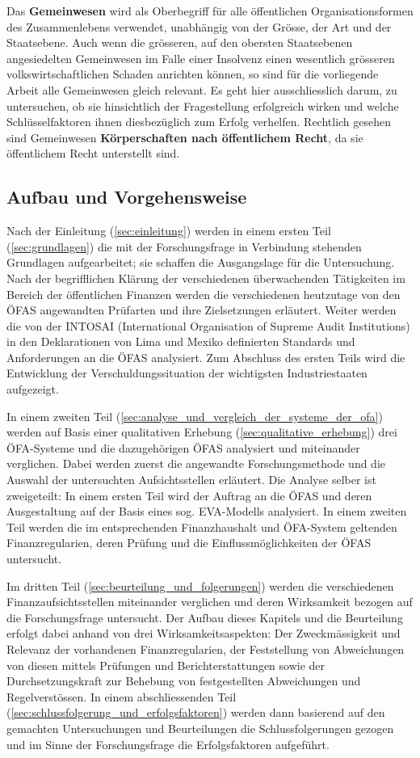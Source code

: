 \documentclass[10pt]{article}
\begin{document}
Das \textbf{Gemeinwesen} wird als Oberbegriff für alle öffentlichen Organisationsformen des Zusammenlebens verwendet, unabhängig von der Grösse, der Art und der Staatsebene. Auch wenn die grösseren, auf den obersten Staatsebenen angesiedelten Gemeinwesen im Falle einer Insolvenz einen wesentlich grösseren volkswirtschaftlichen Schaden anrichten können, so sind für die vorliegende Arbeit alle Gemeinwesen gleich relevant. Es geht hier ausschliesslich darum, zu untersuchen, ob sie hinsichtlich der Fragestellung erfolgreich wirken und welche Schlüsselfaktoren ihnen diesbezüglich zum Erfolg verhelfen. Rechtlich gesehen sind Gemeinwesen \textbf{Körperschaften nach öffentlichem Recht}, da sie öffentlichem Recht unterstellt sind.

\subsection{Aufbau und Vorgehensweise}\label{subsec:aufbau_und_vorgehensweise}
Nach der Einleitung (\vref{sec:einleitung}) werden in einem ersten Teil (\vref{sec:grundlagen}) die mit der Forschungsfrage in Verbindung stehenden Grundlagen aufgearbeitet; sie schaffen die Ausgangslage für die Untersuchung. Nach der begrifflichen Klärung der verschiedenen überwachenden Tätigkeiten im Bereich der öffentlichen Finanzen werden die verschiedenen heutzutage von den ÖFAS angewandten Prüfarten und ihre Zielsetzungen erläutert. Weiter werden die von der INTOSAI (International Organisation of Supreme Audit Institutions) in den Deklarationen von Lima und Mexiko definierten Standards und Anforderungen an die ÖFAS analysiert. Zum Abschluss des ersten Teils wird die Entwicklung der Verschuldungssituation der wichtigsten Industriestaaten aufgezeigt.

In einem zweiten Teil (\vref{sec:analyse_und_vergleich_der_systeme_der_ofa}) werden auf Basis einer qualitativen Erhebung (\vref{sec:qualitative_erhebung}) drei ÖFA-Systeme und die dazugehörigen ÖFAS analysiert und miteinander verglichen. Dabei werden zuerst die angewandte Forschungsmethode und die Auswahl der untersuchten Aufsichtsstellen erläutert. Die Analyse selber ist zweigeteilt: In einem ersten Teil wird der Auftrag an die ÖFAS und deren Ausgestaltung auf der Basis eines sog. EVA-Modells analysiert. In einem zweiten Teil werden die im entsprechenden Finanzhaushalt und ÖFA-System geltenden Finanzregularien, deren Prüfung und die Einflussmöglichkeiten der ÖFAS untersucht.

Im dritten Teil (\vref{sec:beurteilung_und_folgerungen}) werden die verschiedenen Finanzaufsichtsstellen miteinander verglichen und deren Wirksamkeit bezogen auf die Forschungsfrage untersucht. Der Aufbau dieses Kapitels und die Beurteilung erfolgt dabei anhand von drei Wirksamkeitsaspekten: Der Zweckmässigkeit und Relevanz der vorhandenen Finanzregularien, der Feststellung von Abweichungen von diesen mittels Prüfungen und Berichterstattungen sowie der Durchsetzungskraft zur Behebung von festgestellten Abweichungen und Regelverstössen. In einem abschliessenden Teil (\vref{sec:schlussfolgerung_und_erfolgsfaktoren}) werden dann basierend auf den gemachten Untersuchungen und Beurteilungen die Schlussfolgerungen gezogen und im Sinne der Forschungsfrage die Erfolgsfaktoren aufgeführt.
\end{document}
